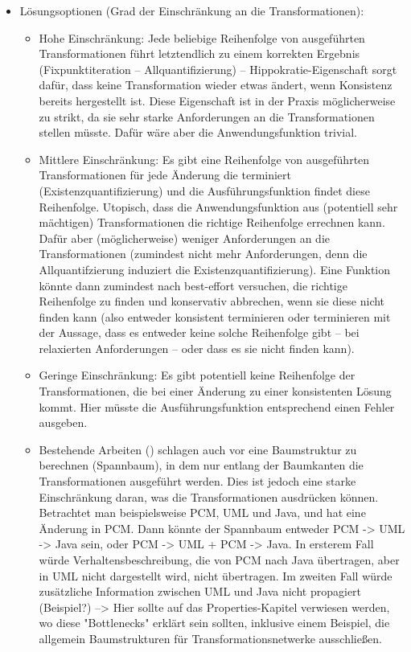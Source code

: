 \begin{itemize}
\begin{itemize}
    \end{itemize}
    \item Lösungsoptionen (Grad der Einschränkung an die Transformationen):
    \begin{itemize}
        \item Hohe Einschränkung: Jede beliebige Reihenfolge von ausgeführten Transformationen führt letztendlich zu einem korrekten Ergebnis (Fixpunktiteration -- Allquantifizierung) -- Hippokratie-Eigenschaft sorgt dafür, dass keine Transformation wieder etwas ändert, wenn Konsistenz bereits hergestellt ist.
        Diese Eigenschaft ist in der Praxis möglicherweise zu strikt, da sie sehr starke Anforderungen an die Transformationen stellen müsste. Dafür wäre aber die Anwendungsfunktion trivial.
        \item Mittlere Einschränkung: Es gibt eine Reihenfolge von ausgeführten Transformationen für jede Änderung die terminiert (Existenzquantifizierung) und die Ausführungsfunktion findet diese Reihenfolge.
        Utopisch, dass die Anwendungsfunktion aus (potentiell sehr mächtigen) Transformationen die richtige Reihenfolge errechnen kann. Dafür aber (möglicherweise) weniger Anforderungen an die Transformationen (zumindest nicht mehr Anforderungen, denn die Allquantifzierung induziert die Existenzquantifizierung). Eine Funktion könnte dann zumindest nach best-effort versuchen, die richtige Reihenfolge zu finden und konservativ abbrechen, wenn sie diese nicht finden kann (also entweder konsistent terminieren oder terminieren mit der Aussage, dass es entweder keine solche Reihenfolge gibt -- bei relaxierten Anforderungen -- oder dass es sie nicht finden kann).  
        \item Geringe Einschränkung: Es gibt potentiell keine Reihenfolge der Transformationen, die bei einer Änderung zu einer konsistenten Lösung kommt. Hier müsste die Ausführungsfunktion entsprechend einen Fehler ausgeben.
        \item Bestehende Arbeiten (\cite{stevens2017a}) schlagen auch vor eine Baumstruktur zu berechnen (Spannbaum), in dem nur entlang der Baumkanten die Transformationen ausgeführt werden. Dies ist jedoch eine starke Einschränkung daran, was die Transformationen ausdrücken können. Betrachtet man beispielsweise PCM, UML und Java, und hat eine Änderung in PCM. Dann könnte der Spannbaum entweder PCM -> UML -> Java sein, oder PCM -> UML + PCM -> Java. In ersterem Fall würde Verhaltensbeschreibung, die von PCM nach Java übertragen, aber in UML nicht dargestellt wird, nicht übertragen. Im zweiten Fall würde zusätzliche Information zwischen UML und Java nicht propagiert (Beispiel?) --> Hier sollte auf das Properties-Kapitel verwiesen werden, wo diese "Bottlenecks" erklärt sein sollten, inklusive einem Beispiel, die allgemein Baumstrukturen für Transformationsnetwerke ausschließen.

\end{itemize}
\end{itemize}
